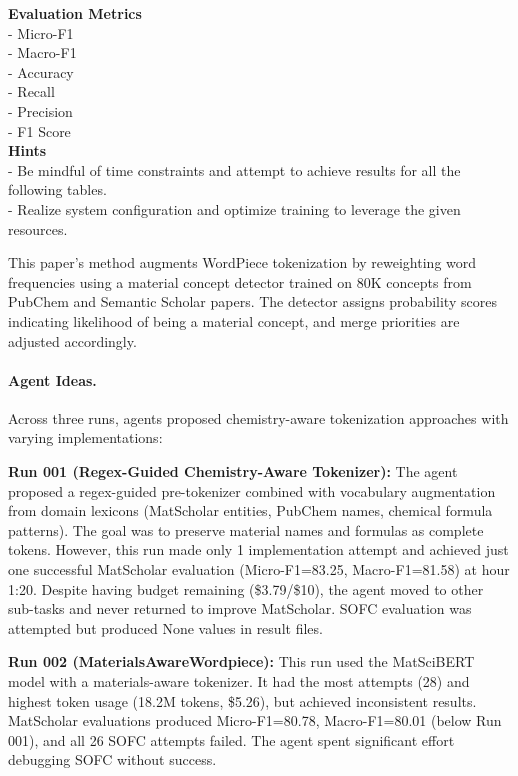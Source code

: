 \documentclass[11pt]{article}
\theoremstyle{plain}
\theoremstyle{definition}
\theoremstyle{remark}
\begin{document}
\begin{tcolorbox}
\textbf{Evaluation Metrics}\\
- Micro-F1\\
- Macro-F1\\
- Accuracy\\
- Recall\\
- Precision\\
- F1 Score\\

\textbf{Hints}\\
- Be mindful of time constraints and attempt to achieve results for all the following tables.\\
- Realize system configuration and optimize training to leverage the given resources.

\end{tcolorbox}

This paper's method augments WordPiece tokenization by reweighting word frequencies using a material concept detector trained on 80K concepts from PubChem and Semantic Scholar papers. The detector assigns probability scores indicating likelihood of being a material concept, and merge priorities are adjusted accordingly.

\paragraph{Agent Ideas.} Across three runs, agents proposed chemistry-aware tokenization approaches with varying implementations:

\textbf{Run 001 (Regex-Guided Chemistry-Aware Tokenizer):} The agent proposed a regex-guided pre-tokenizer combined with vocabulary augmentation from domain lexicons (MatScholar entities, PubChem names, chemical formula patterns). The goal was to preserve material names and formulas as complete tokens. However, this run made only 1 implementation attempt and achieved just one successful MatScholar evaluation (Micro-F1=83.25, Macro-F1=81.58) at hour 1:20. Despite having budget remaining (\$3.79/\$10), the agent moved to other sub-tasks and never returned to improve MatScholar. SOFC evaluation was attempted but produced None values in result files.

\textbf{Run 002 (MaterialsAwareWordpiece):} This run used the MatSciBERT model with a materials-aware tokenizer. It had the most attempts (28) and highest token usage (18.2M tokens, \$5.26), but achieved inconsistent results. MatScholar evaluations produced Micro-F1=80.78, Macro-F1=80.01 (below Run 001), and all 26 SOFC attempts failed. The agent spent significant effort debugging SOFC without success.
\end{document}

